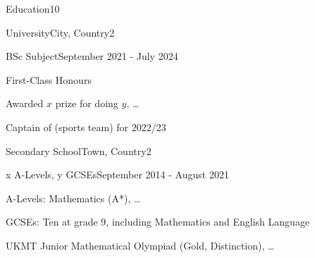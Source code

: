\documentclass[10pt,a4paper]{CV}
\begin{document}
\selectfont

\StopCensoring %


\begin{Section}{Education}{10}
    \begin{Institution}{University}{City, Country}{2}
        \begin{Position}{BSc Subject}{September 2021 - July 2024}
            \item First-Class Honours
            \item Awarded $x$ prize for doing $y$, \dots
            \item Captain of (sports team) for 2022/23
        \end{Position}
    \end{Institution}

    \begin{Institution}{Secondary School}{Town, Country}{2}
        \begin{Position}{x A-Levels, y GCSEs}{September 2014 - August 2021}
            \item A-Levels: Mathematics (A*), \dots
            \item GCSEs: Ten at grade 9, including Mathematics and English Language
            \item UKMT Junior Mathematical Olympiad (Gold, Distinction), \dots
        \end{Position}
    \end{Institution}
\end{Section}
\end{document}
